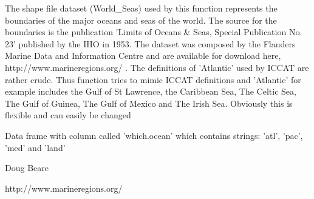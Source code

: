 \documentclass[letterpaper]{book}
\begin{document}
\begin{Details}\relax

The shape file dataset (World\_Seas) used by this function represents the boundaries of the major oceans and seas of the world. The source for the boundaries is the publication 'Limits of Oceans \& Seas, Special Publication No. 23' published by the IHO in 1953. The dataset was composed by the Flanders Marine Data and Information Centre and are available for download here, http://www.marineregions.org/ . The definitions of 'Atlantic' used by ICCAT are rather crude. Thus function tries to mimic ICCAT definitions and 'Atlantic' for example includes the Gulf of St Lawrence, the Caribbean Sea, The Celtic Sea, The Gulf of Guinea, The Gulf of Mexico and The Irish Sea. Obviously this is flexible and can easily be changed



\end{Details}
%
\begin{Value}
Data frame with column called 'which.ocean' which contains strings: 'atl', 'pac', 'med' and 'land'
\end{Value}
%
\begin{Author}\relax
Doug Beare
\end{Author}
%
\begin{References}\relax
http://www.marineregions.org/
\end{References}
%
\end{document}
